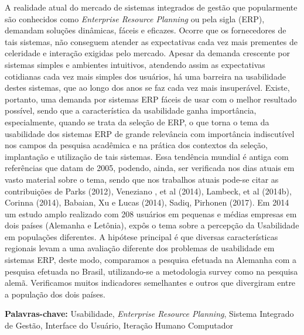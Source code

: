 \begin{resumo}
\normalsize

A realidade atual do mercado de sistemas integrados de gestão que popularmente são conhecidos como \textit{Enterprise Resource Planning} ou pela sigla (ERP), demandam soluções dinâmicas, fáceis e eficazes. Ocorre que os fornecedores de tais sistemas, não conseguem atender as expectativas cada vez mais prementes de celeridade e interação exigidas pelo mercado. Apesar da demanda crescente por sistemas simples e ambientes intuitivos, atendendo assim as expectativas cotidianas cada vez mais simples dos usuários, há uma barreira na usabilidade destes sistemas, que ao longo dos anos se faz cada vez mais insuperável. Existe, portanto, uma demanda por sistemas ERP fáceis de usar com o melhor resultado possível, sendo que a característica da usabilidade ganha importância, especialmente, quando se trata da seleção de ERP, o que torna o tema da usabilidade dos sistemas ERP de grande relevância com importância indiscutível nos campos da pesquisa acadêmica e na prática dos contextos da seleção, implantação e utilização de tais sistemas. Essa tendência mundial é antiga com referências que datam de 2005, podendo, ainda, ser verificada nos dias atuais em vasto material sobre o tema, sendo que nos trabalhos atuais pode-se citar as contribuições de Parks (2012), Veneziano , et al (2014), Lambeck, et al (2014b), Corinna (2014), Babaian, Xu e Lucas (2014), Sadiq, Pirhonen (2017). Em 2014 um estudo amplo realizado com 208 usuários em pequenas e  médias empresas em dois países (Alemanha e Letônia), expôs o tema sobre a percepção da Usabilidade em populações diferentes. A hipótese principal é que diversas características regionais levam a uma avaliação diferente dos problemas de usabilidade em sistemas ERP, deste modo, comparamos a pesquisa efetuada na Alemanha com a pesquisa efetuada no Brasil, utilizando-se a metodologia survey como na pesquisa alemã. Verificamos muitos indicadores semelhantes e outros que divergiram entre a população dos dois países.


\vspace{\onelineskip}

\noindent
\textbf{Palavras-chave:} Usabilidade, \textit{Enterprise Resource Planning}, Sistema Integrado de Gestão, Interface do Usuário, Iteração Humano Computador
\end{resumo}


